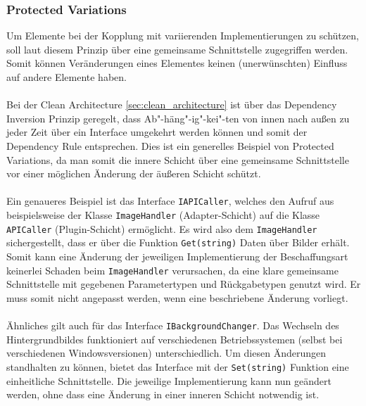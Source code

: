 \subsubsection{Protected Variations}
Um Elemente bei der Kopplung mit variierenden Implementierungen zu schützen, soll laut diesem Prinzip über eine gemeinsame Schnittstelle zugegriffen werden.
Somit können Veränderungen eines Elementes keinen (unerwünschten) Einfluss auf andere Elemente haben.\\
\\
Bei der Clean Architecture \ref{sec:clean_architecture} ist über das Dependency Inversion Prinzip geregelt, dass Ab"-häng"-ig"-kei"-ten von innen nach außen zu jeder Zeit über ein Interface umgekehrt werden können und somit der Dependency Rule entsprechen.
Dies ist ein generelles Beispiel von Protected Variations, da man somit die innere Schicht über eine gemeinsame Schnittstelle vor einer möglichen Änderung der äußeren Schicht schützt.\\
\\
Ein genaueres Beispiel ist das Interface \texttt{IAPICaller}, welches den Aufruf aus beispielsweise der Klasse \texttt{ImageHandler} (Adapter-Schicht) auf die Klasse \texttt{APICaller} (Plugin-Schicht) ermöglicht.
Es wird also dem \texttt{ImageHandler} sichergestellt, dass er über die Funktion \texttt{Get(string)} Daten über Bilder erhält.
Somit kann eine Änderung der jeweiligen Implementierung der Beschaffungsart keinerlei Schaden beim \texttt{ImageHandler} verursachen, da eine klare gemeinsame Schnittstelle mit gegebenen Parametertypen und Rückgabetypen genutzt wird. Er muss somit nicht angepasst werden, wenn eine beschriebene Änderung vorliegt.\\
\\
Ähnliches gilt auch für das Interface \texttt{IBackgroundChanger}.
Das Wechseln des Hintergrundbildes funktioniert auf verschiedenen Betriebssystemen (selbst bei verschiedenen Windowsversionen) unterschiedlich. 
Um diesen Änderungen standhalten zu können, bietet das Interface mit der \texttt{Set(string)} Funktion eine einheitliche Schnittstelle.
Die jeweilige Implementierung kann nun geändert werden, ohne dass eine Änderung in einer inneren Schicht notwendig ist.
